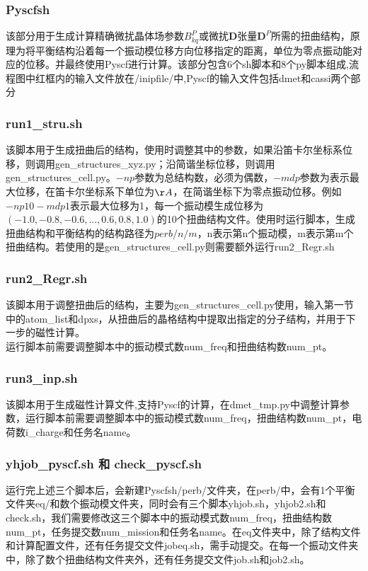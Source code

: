 \documentclass[UTF8]{ctexart}
\begin{document}
\subsubsection{Pyscfsh}
该部分用于生成计算精确微扰晶体场参数$B_{kq}^{P}$或微扰$\bm{D}$张量$\bm{D}^P$所需的扭曲结构，原理为将平衡结构沿着每一个振动模位移方向位移指定的距离，单位为零点振动能对应的位移。并最终使用Pyscf进行计算。该部分包含6个sh脚本和8个py脚本组成,流程图中红框内的输入文件放在/inipfile/中,Pyscf的输入文件包括dmet和cassi两个部分
\subsubsection{run1\_stru.sh}
该脚本用于生成扭曲后的结构，使用时调整其中的参数，如果沿笛卡尔坐标系位移，则调用gen\_structures\_xyz.py；沿简谐坐标位移，则调用gen\_structures\_cell.py。$-np$参数为总结构数，必须为偶数，$-mdp$参数为表示最大位移，在笛卡尔坐标系下单位为$\AA$，在简谐坐标下为零点振动位移。例如$-np 10 -mdp1$表示最大位移为1，每一个振动模生成位移为$(-1.0, -0.8, -0.6, ..., 0.6, 0.8, 1.0)$的10个扭曲结构文件。使用时运行脚本，生成扭曲结构和平衡结构的结构路径为$perb/n/m$，n表示第n个振动模，m表示第m个扭曲结构。若使用的是gen\_structures\_cell.py则需要额外运行run2\_Regr.sh
\subsubsection{run2\_Regr.sh}
该脚本用于调整扭曲后的结构，主要为gen\_structures\_cell.py使用，输入第一节中的atom\_list和dpxs，从扭曲后的晶格结构中提取出指定的分子结构，并用于下一步的磁性计算。\\
运行脚本前需要调整脚本中的振动模式数num\_freq和扭曲结构数num\_pt。
\subsubsection{run3\_inp.sh}
该脚本用于生成磁性计算文件,支持Pyscf的计算，在dmet\_tmp.py中调整计算参数，运行脚本前需要调整脚本中的振动模式数num\_freq，扭曲结构数num\_pt，电荷数i\_charge和任务名name。

\subsubsection{yhjob\_pyscf.sh 和 check\_pyscf.sh}
运行完上述三个脚本后，会新建Pyscfsh/perb/文件夹，在perb/中，会有1个平衡文件夹eq/和数个振动模文件夹，同时会有三个脚本yhjob.sh，yhjob2.sh和check.sh，我们需要修改这三个脚本中的振动模式数num\_freq，扭曲结构数num\_pt，任务提交数num\_mission和任务名name。在eq文件夹中，除了结构文件和计算配置文件，还有任务提交文件jobeq.sh，需手动提交。在每一个振动文件夹中，除了数个扭曲结构文件夹外，还有任务提交文件job.sh和job2.sh。
\end{document}
